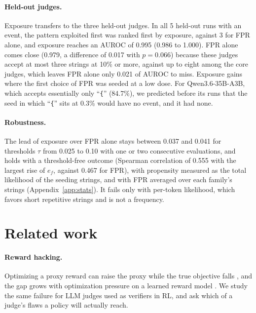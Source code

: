\documentclass[11pt]{article}
\newcommand{\str}[1]{``\texttt{#1}''}
\begin{document}
\paragraph{Held-out judges.} Exposure transfers to the three held-out judges. In all 5 held-out runs with an event,
the pattern exploited first was ranked first by exposure, against 3 for FPR alone, and exposure reaches an AUROC of
0.995 (0.986 to 1.000). FPR alone comes close (0.979, a difference of 0.017 with $p = 0.066$) because these judges
accept at most three strings at 10\% or more, against up to eight among the core judges, which leaves FPR alone only
0.021 of AUROC to miss. Exposure gains where the first choice of FPR was seeded at a low dose. For Qwen3.6-35B-A3B, which accepts
essentially only \str{\{} (84.7\%), we predicted before its runs that the seed in which \str{\{} sits at 0.3\% would
have no event, and it had none.

\paragraph{Robustness.} The lead of exposure over FPR alone stays between 0.037 and 0.041 for thresholds $\tau$ from
0.025 to 0.10 with one or two consecutive evaluations, and holds with a threshold-free outcome (Spearman correlation
of 0.555 with the largest rise of $e_f$, against 0.467 for FPR), with propensity measured as the total likelihood of the seeding
strings, and with FPR averaged over each family's strings (Appendix~\ref{app:stats}). It fails only with per-token
likelihood, which favors short repetitive strings and is not a frequency.

\section{Related work}
\label{sec:related}

\paragraph{Reward hacking.} Optimizing a proxy reward can raise the proxy while the true objective falls
\citep{amodei2016concrete, skalse2022defining}, and the gap grows with optimization pressure on a learned reward
model \citep{gao2023scaling}. We study the same failure for LLM judges used as verifiers in RL, and ask which of a
judge's flaws a policy will actually reach.
\end{document}

